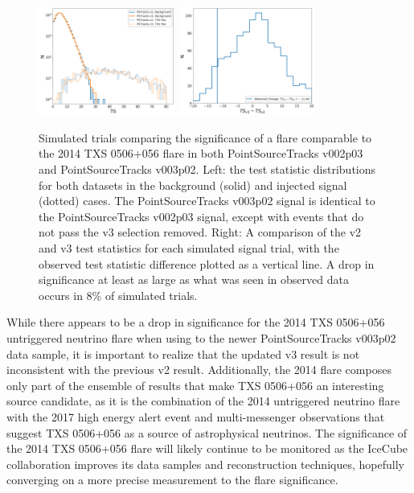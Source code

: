 \begin{figure}[h]
\centering
\includegraphics[width=0.4\textwidth]{figs/v2v3tsdists.png}
\includegraphics[width=0.4\textwidth]{figs/v2v3tsdiff.png}
\caption{Simulated trials comparing the significance of a flare comparable to the 2014 TXS 0506+056 flare in both PointSourceTracks v002p03 and PointSourceTracks v003p02. Left: the test statistic distributions for both datasets in the background (solid) and injected signal (dotted) cases. The PointSourceTracks v003p02 signal is identical to the PointSourceTracks v002p03 signal, except with events that do not pass the v3 selection removed. Right: A comparison of the v2 and v3 test statistics for each simulated signal trial, with the observed test statistic difference plotted as a vertical line. A drop in significance at least as large as what was seen in observed data occurs in 8\% of simulated trials.}
\label{fig:v2v3diff}
\end{figure}

While there appears to be a drop in significance for the 2014 TXS 0506+056 untriggered neutrino flare when using to the newer PointSourceTracks v003p02 data sample, it is important to realize that the updated v3 result is not inconsistent with the previous v2 result. Additionally, the 2014 flare composes only part of the ensemble of results that make TXS 0506+056 an interesting source candidate, as it is the combination of the 2014 untriggered neutrino flare with the 2017 high energy alert event and multi-messenger observations that suggest TXS 0506+056 as a source of astrophysical neutrinos. The significance of the 2014 TXS 0506+056 flare will likely continue to be monitored as the IceCube collaboration improves its data samples and reconstruction techniques, hopefully converging on a more precise measurement to the flare significance. 


